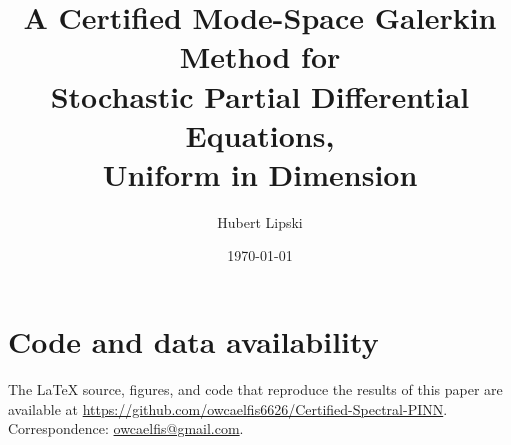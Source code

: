\documentclass[11pt]{article}
\title{A Certified Mode-Space Galerkin Method for\\
Stochastic Partial Differential Equations,\\
Uniform in Dimension}
\author{Hubert Lipski}
\date{\today}
\begin{document}
\maketitle









\section*{Code and data availability}
The \LaTeX{} source, figures, and code that reproduce the results of this paper are
available at \url{https://github.com/owcaelfis6626/Certified-Spectral-PINN}.
Correspondence: \href{mailto:owcaelfis@gmail.com}{owcaelfis@gmail.com}.


\end{document}
